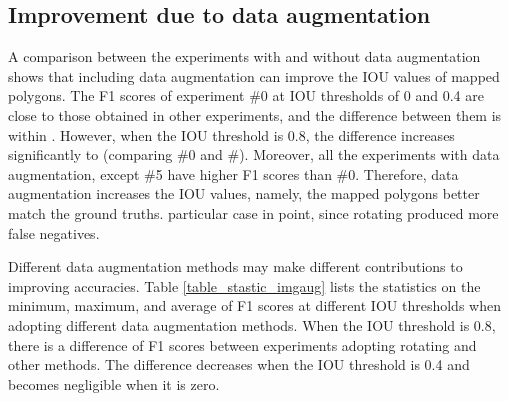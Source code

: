 \documentclass[authoryear,preprint,review,12pt]{elsarticle}
\begin{document}

\subsection{Improvement due to data augmentation}
\label{subsec_contrib_dataAug}

A comparison between the experiments with and without data augmentation shows that including data augmentation can improve the IOU values of mapped polygons.  The F1 scores of experiment \#0 at IOU thresholds of 0 and 0.4 are close to those obtained in other experiments, and the difference between them is within . 
However, when the IOU threshold is 0.8, the difference increases significantly to  (comparing \#0 and \#). Moreover, all the experiments with data augmentation, except \#5  have higher F1 scores than \#0.  Therefore, data augmentation increases the IOU values, namely, the mapped polygons better match the ground truths.  particular case in point, since rotating produced more false negatives. 


Different data augmentation methods may make different contributions to improving accuracies. Table \ref{table_stastic_imgaug} lists the statistics on the minimum, maximum, and average of F1 scores at different IOU thresholds when adopting different data augmentation methods. 
When the IOU threshold is 0.8, there is a difference of F1 scores between experiments adopting rotating and other methods. The difference decreases when the IOU threshold is 0.4 and becomes negligible when it is zero. 
\end{document}
